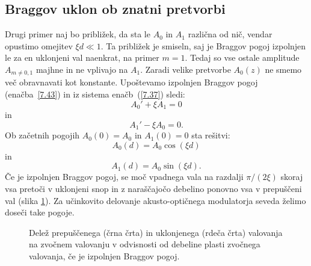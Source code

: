 \subsection*{Braggov uklon ob znatni pretvorbi}
Drugi primer naj bo približek, da sta le $A_{0}$ in $A_{1}$ različna od nič, 
vendar opustimo omejitev $\xi d\ll 1$. Ta približek je smiseln, saj je 
Braggov pogoj izpolnjen le za en uklonjeni val naenkrat, na
primer $m=1$. Tedaj so vse ostale amplitude $A_{m\ne0,1}$
majhne in ne vplivajo na $A_{1}$. Zaradi velike pretvorbe 
$A_{0}(z)$ ne smemo več obravnavati kot konstante. Upoštevamo 
izpolnjen Braggov pogoj (enačba~\ref{7.43}) in iz sistema enačb~(\ref{7.37})
sledi:
\begin{equation}
A_{0}'+\xi A_{1}  =  0
\end{equation}
in 
\begin{equation}
A_{1}'-\xi A_{0} =  0.
\end{equation}
Ob začetnih pogojih $A_{0}(0)=A_{0}$ in $A_{1}(0)=0$ sta rešitvi:
\begin{equation}
A_{0}(d) = A_{0}\cos (\xi d)
\end{equation}
in 
\begin{equation}
A_{1}(d) = A_{0}\sin (\xi d).
\end{equation}
Če je izpolnjen Braggov pogoj, se moč vpadnega vala na razdalji $\pi/(2\xi)$
skoraj vsa pretoči v uklonjeni snop in z naraščajočo debelino ponovno vsa v
prepuščeni val (slika \ref{s7.10}).
Za učinkovito delovanje akusto-optičnega modulatorja seveda
želimo doseči take pogoje.
\begin{figure}[ht]
\centering
\def\svgwidth{80truemm} 

\caption{Delež prepuščenega (črna črta) in uklonjenega (rdeča črta) 
valovanja na zvočnem valovanju v odvisnosti od debeline plasti zvočnega valovanja, če
je izpolnjen Braggov pogoj.}
\label{s7.10}
\end{figure}

